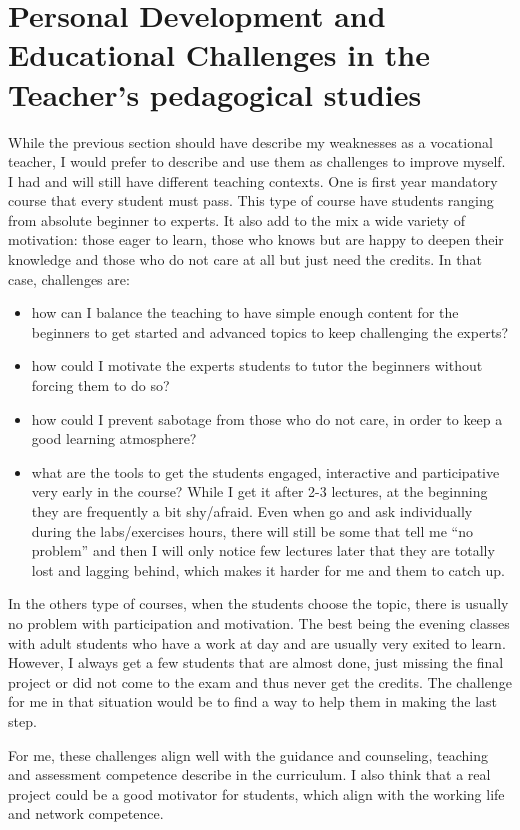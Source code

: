 \section{Personal Development and Educational Challenges in the Teacher's pedagogical studies}

While the previous section should have describe my weaknesses as a vocational teacher, I would prefer to describe and use them as challenges to improve myself.
I had and will still have different teaching contexts. 
One is first year mandatory course that every student must pass.
This type of course have students ranging from absolute beginner to experts.
It also add to the mix a wide variety of motivation: those eager to learn, those who knows but are happy to deepen their knowledge and those who do not care at all but just need the credits.
In that case, challenges are:
\begin{itemize}
\item how can I balance the teaching to have simple enough content for the beginners to get started and advanced topics to keep challenging the experts?
\item how could I motivate the experts students to tutor the beginners without forcing them to do so?
\item how could I prevent sabotage from those who do not care, in order to keep a good learning atmosphere?
\item what are the tools to get the students engaged, interactive and participative very early in the course?
While I get it after 2-3 lectures, at the beginning they are frequently a bit shy/afraid. 
Even when go and ask individually during the labs/exercises hours, there will still be some that tell me ``no problem'' and then I will only notice few lectures later that they are totally lost and lagging behind, which makes it harder for me and them to catch up. 
\end{itemize}
  
In the others type of courses, when the students choose the topic, there is usually no problem with participation and motivation. 
The best being the evening classes with adult students who have a work at day and are usually very exited to learn. 
However, I always get a few students that are almost done, just missing the final project or did not come to the exam and thus never get the credits. 
The challenge for me in that situation would be to find a way to help them in making the last step.

For me, these challenges align well with the guidance and counseling, teaching and assessment competence describe in the curriculum. 
I also think that a real project could be a good motivator for students, which align with the working life and network competence. 
  